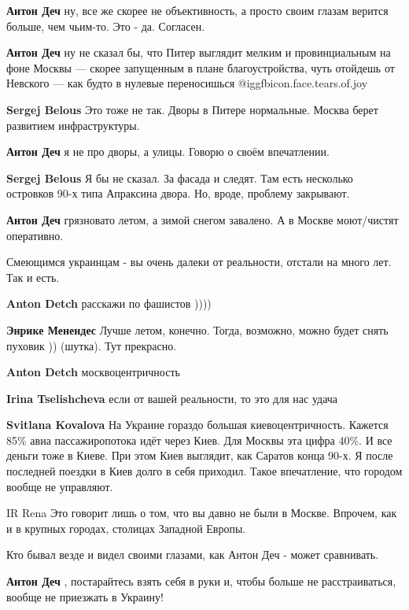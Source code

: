 \begin{itemize}
\begin{itemize}
\textbf{Антон Деч} ну, все же скорее не объективность, а просто своим глазам верится больше, чем чьим-то. Это - да. Согласен.

\textbf{Антон Деч} ну не сказал бы, что Питер выглядит мелким и провинциальным на фоне Москвы — скорее запущенным в плане благоустройства, чуть отойдешь от Невского — как будто в нулевые переносишься  @igg{fbicon.face.tears.of.joy} 

\textbf{Sergej Belous} Это тоже не так. Дворы в Питере нормальные.
Москва берет развитием инфраструктуры.

\textbf{Антон Деч} я не про дворы, а улицы. Говорю о своём впечатлении.

\textbf{Sergej Belous} Я бы не сказал. За фасада и следят.
Там есть несколько островков 90-х типа Апраксина двора. Но, вроде, проблему закрывают.

\textbf{Антон Деч} грязновато летом, а зимой снегом завалено. А в Москве моют/чистят оперативно.

Смеющимся украинцам - вы очень далеки от реальности, отстали на много лет. Так и есть.

\textbf{Anton Detch} расскажи по фашистов ))))

\textbf{Энрике Менендес} Лучше летом, конечно. Тогда, возможно, можно будет снять пуховик )) (шутка). Тут прекрасно.

\textbf{Anton Detch} москвоцентричность

\textbf{Irina Tselishcheva} если от вашей реальности, то это для нас удача

\textbf{Svitlana Kovalova} На Украине гораздо большая киевоцентричность. Кажется 85\% авиа пассажиропотока идёт через Киев. Для Москвы эта цифра 40\%.
И все деньги тоже в Киеве. При этом Киев выглядит, как Саратов конца 90-х.
Я после последней поездки в Киев долго в себя приходил. Такое впечатление, что городом вообще не управляют.

IR Rena Это говорит лишь о том, что вы давно не были в Москве. Впрочем, как и в крупных городах, столицах Западной Европы.

Кто бывал везде и видел своими глазами, как Антон Деч - может сравнивать.

\textbf{Антон Деч} , постарайтесь взять себя в руки и, чтобы больше не расстраиваться, вообще не приезжать в Украину!


\end{itemize}
\end{itemize}
